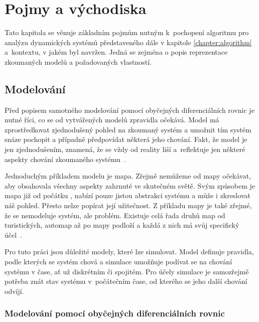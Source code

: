 \chapter{Pojmy a východiska}\label{chapter:preliminaries}

Tato kapitola se věnuje základním pojmům nutným k~pochopení
algoritmu pro analýzu dynamických systémů představeného dále v kapitole \ref{chapter:algorithm}
a~kontextu, v jakém byl navržen. Jedná se zejména o popis reprezentace zkou\-ma\-ných
modelů a požadovaných vlastností.


\section{Modelování}

Před popisem samotného modelování pomocí obyčejných diferenciálních rovnic je
nutné říci, co se od vytvářených modelů zpravidla očekává. Model má zpro\-středko\-vat
zjednodušený pohled na zkoumaný systém a umožnit tím systém snáze pochopit a
případně předpovídat některá jeho chování. Fakt, že model je jen zjednodušením, znamená,
že se vždy od reality liší a~reflektuje jen některé aspekty chování zkoumaného
systému~\cite[str. 48]{pelanek2012}.


Jednoduchým příkladem modelu je mapa. Zřejmě nemůžeme od mapy očekávat, aby obsahovala
všechny aspekty zahrnuté ve skutečném světě. Svým způsobem je mapa již od počátku
, nabízí pouze jistou abstrakci systému a může i zkreslovat náš pohled.
Přesto nelze popírat její užitečnost. Z příkladu mapy je také zřejmé, že se
nemodeluje systém, ale problém. Existuje celá řada druhů map od turistických, automap
až po mapy podloží a každá z nich má svůj specifický účel~\cite[str. 47 -- 58]{pelanek2012}.

Pro tuto práci jsou důležité modely, které lze simulovat. Model definuje pravidla, podle
kterých se systém chová a simulace umožňuje podívat se na chování systému v čase, ať už
diskrétním či spojitém. Pro účely simulace je sa\-mozřej\-mě potřeba znát stav systému v~počátečním
čase, od kterého se jeho další chování odvíjí.

\subsection{Modelování pomocí obyčejných diferenciálních rovnic}

